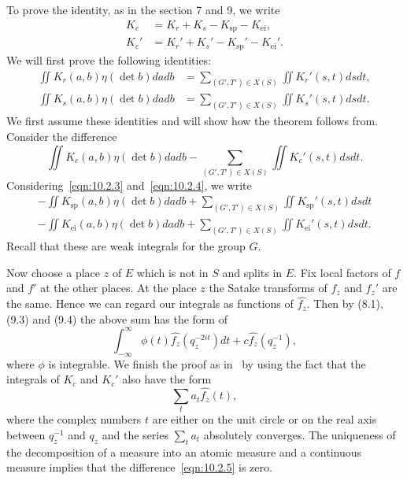 \subsection{}
To prove the identity, as in the section 7 and 9, we write
\begin{align}
    K_c &= K_r + K_s - K_{\mathrm{sp}} - K_{\mathrm{ei}}, \\
    K_c' &= K_r' + K_s' - K_{\mathrm{sp}}' - K_{\mathrm{ei}}'.
\end{align}
We will first prove the following identities:
\begin{align}
    \iint K_r(a, b) \eta(\det b) dadb &= \sum_{(G', T') \in X(S)} \iint K_{r}'(s, t) dsdt, \label{eqn:10.2.3} \\
    \iint K_s(a, b) \eta(\det b) dadb &= \sum_{(G', T') \in X(S)} \iint K_{s}'(s, t) dsdt. \label{eqn:10.2.4}
\end{align}
We first assume these identities and will show how the theorem follows from.
Consider the difference
\begin{equation}
\label{eqn:10.2.5}
    \iint K_c(a, b)\eta(\det b)dadb - \sum_{(G', T') \in X(S)} \iint K_c'(s, t)dsdt.
\end{equation}
Considering~\eqref{eqn:10.2.3} and~\eqref{eqn:10.2.4}, we write 
\begin{align*}
    -\iint K_{\mathrm{sp}}(a, b) \eta(\det b) dadb + \sum_{(G', T') \in X(S)} \iint K_{\mathrm{sp}}'(s, t)dsdt \\
    -\iint K_{\mathrm{ei}}(a, b) \eta(\det b) dadb + \sum_{(G', T') \in X(S)} \iint K_{\mathrm{ei}}'(s, t)dsdt.
\end{align*}
Recall that these are weak integrals for the group $G$.

Now choose a place $z$ of $E$ which is not in $S$ and splits in $E$.
Fix local factors of $f$ and $f'$ at the other places.
At the place $z$ the Satake transforms of $f_z$ and $f_z'$ are the same.
Hence we can regard our integrals as functions of $\hat{f_z}$.
Then by (8.1), (9.3) and (9.4) the above sum has the form of
\begin{equation}
    \int_{-\infty}^{\infty} \phi(t) \hat{f_z}(q_{z}^{-2it})dt + c \hat{f_z}(q_z^{-1}),
\end{equation}
where $\phi$ is integrable.
We finish the proof as in~\cite{langlands1980base} by using the fact that the integrals of $K_c$ and $K_c'$ also have the form
\begin{equation}
    \sum_{t} a_{t} \hat{f_z}(t),
\end{equation}
where the complex numbers $t$ are either on the unit circle or on the real axis between $q_z^{-1}$ and $q_z$ and the series $\sum_t a_t$ absolutely converges.
The uniqueness of the decomposition of a measure into an atomic measure and a continuous measure implies that the difference~\eqref{eqn:10.2.5} is zero.


